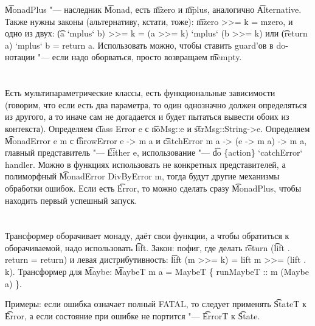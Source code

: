 \t{MonadPlus} "--- наследник \t{Monad}, есть \t{mzero} и \t{mplus}, аналогично \t{Alternative}.
Также нужны законы (альтернативу, кстати, тоже): \t{mzero >>= k = mzero}, и одно из двух:
\t{(a `mplus` b) >>= k = (a >>= k) `mplus` (b >>= k)} или \t{(return a) `mplus` b = return a}.
Использовать можно, чтобы ставить guard'ов в do-нотации "--- если надо оборваться, просто возвращаем \t{mempty}.

\section{} %
Есть мультипараметрические классы, есть функциональные зависимости (говорим, что если есть два параметра, то один однозначно
должен определяться из другого, а то иначе сам не догадается и будет пытаться вывести обоих из контекста).
Определяем \t{class Error e} с \t{noMsg::e} и \t{strMsg::String->e}.
Определяем \t{MonadError e m} с \t{throwError e -> m a} и \t{catchError m a -> (e -> m a) -> m a},
главный представитель "--- \t{Either e}, использование "--- \t{do \{action\} `catchError` handler}.
Можно в функциях использовать не конкретных представителей, а полиморфный \t{MonadError DivByError m}, тогда
будут другие механизмы обработки ошибок.
Если есть \t{Error}, то можно сделать сразу \t{MonadPlus}, чтобы находить первый успешный запуск.

\section{} %
Трансформер оборачивает монаду, даёт свои функции, а чтобы обратиться к оборачиваемой, надо использовать \t{lift}.
Закон: пофиг, где делать \t{return} (\t{lift . return = return}) и левая дистрибутивность: \t{lift (m >>= k) = lift m >>= (lift . k)}.
Трансформер для \t{Maybe}: \t{MaybeT m a = MaybeT \{ runMaybeT :: m (Maybe a) \}}.

Примеры: если ошибка означает полный FATAL, то следует применять \t{StateT} к \t{Error},
а если состояние при ошибке не портится "--- \t{ErrorT} к \t{State}.

\section{} %
